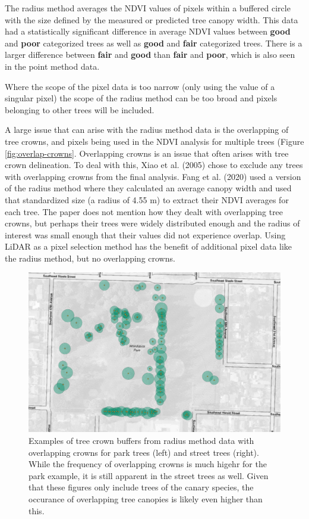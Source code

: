 \documentclass[12pt,twoside]{reedthesis}
\begin{document}
The radius method averages the NDVI values of pixels within a buffered
circle with the size defined by the measured or predicted tree canopy
width. This data had a statistically significant difference in average
NDVI values between \textbf{good} and \textbf{poor} categorized trees as well as
\textbf{good} and \textbf{fair} categorized trees. There is a larger difference
between \textbf{fair} and \textbf{good} than \textbf{fair} and \textbf{poor}, which is also
seen in the point method data.

Where the scope of the pixel data is too narrow (only using the value of
a singular pixel) the scope of the radius method can be too broad and
pixels belonging to other trees will be included.

A large issue that can arise with the radius method data is the
overlapping of tree crowns, and pixels being used in the NDVI analysis
for multiple trees (Figure \ref{fig:overlap-crowns}. Overlapping crowns
is an issue that often arises with tree crown delineation. To deal with
this, Xiao et al. (2005) chose to exclude any trees with overlapping crowns from
the final analysis. Fang et al. (2020) used a version of the radius method where
they calculated an average canopy width and used that standardized size
(a radius of 4.55 m) to extract their NDVI averages for each tree. The
paper does not mention how they dealt with overlapping tree crowns, but
perhaps their trees were widely distributed enough and the radius of
interest was small enough that their values did not experience overlap.
Using LiDAR as a pixel selection method has the benefit of additional
pixel data like the radius method, but no overlapping crowns.
\begin{figure}

{\centering \includegraphics[width=0.45\linewidth]{figure/overlapping_park} 

}

\caption[Examples of overlapping park and street tree crowns.]{Examples of tree crown buffers from radius method data with overlapping crowns for park trees (left) and street trees (right). While the frequency of overlapping crowns is much higehr for the park example, it is still apparent in the street trees as well. Given that these figures only include trees of the canary species, the occurance of overlapping tree canopies is likely even higher than this.}\label{fig:overlap-crowns-1}
\end{figure}
\end{document}
